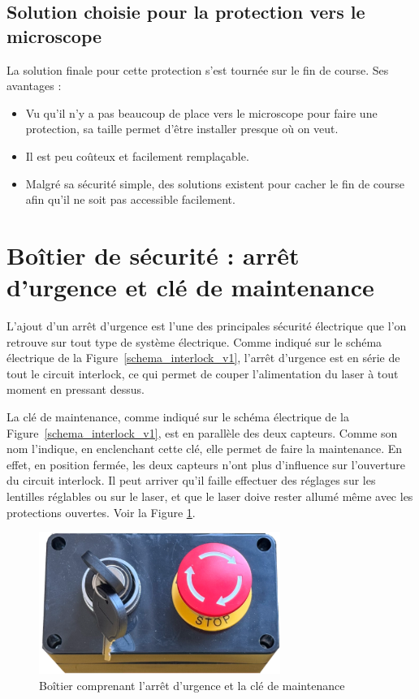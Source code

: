 \subsection{Solution choisie pour la protection vers le microscope}
La solution finale pour cette protection s'est tournée sur le fin de course. Ses avantages :
\begin{itemize}
    \item Vu qu'il n'y a pas beaucoup de place vers le microscope pour faire une protection, sa taille permet d'être installer presque où on veut.
    \item Il est peu coûteux et facilement remplaçable.
    \item Malgré sa sécurité simple, des solutions existent pour cacher le fin de course afin qu'il ne soit pas accessible facilement.
\end{itemize}

\section{Boîtier de sécurité : arrêt d'urgence et clé de maintenance}
\label{subsec:arret_urgence_maintenance}
L'ajout d'un arrêt d'urgence est l'une des principales sécurité électrique que l'on retrouve sur tout type de système électrique. Comme indiqué sur le schéma électrique de la Figure~\ref{schema_interlock_v1}, l'arrêt d'urgence est en série de tout le circuit interlock, ce qui permet de couper l'alimentation du laser à tout moment en pressant dessus.

La clé de maintenance, comme indiqué sur le schéma électrique de la Figure~\ref{schema_interlock_v1}, est en parallèle des deux capteurs. Comme son nom l'indique, en enclenchant cette clé, elle permet de faire la maintenance. En effet, en position fermée, les deux capteurs n'ont plus d'influence sur l'ouverture du circuit interlock. Il peut arriver qu'il faille effectuer des réglages sur les lentilles réglables ou sur le laser, et que le laser doive rester allumé même avec les protections ouvertes. Voir la Figure \ref{boitier_arret_urgence_maintenance}.

\begin{figure}[H]
    \begin{center}
        \includegraphics[width=0.7\textwidth]{assets/figures/Protections_laser/Securite_electrique/boitier_arret_urgence_maintenance.png}
    \end{center}
    \caption{Boîtier comprenant l'arrêt d'urgence et la clé de maintenance}
    \label{boitier_arret_urgence_maintenance}
\end{figure}

